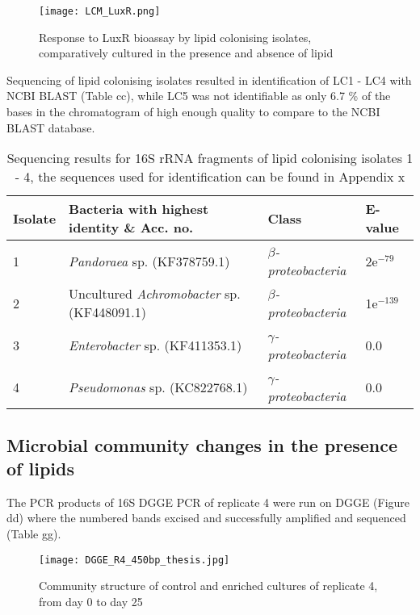 \documentclass{article}
\begin{document}
\begin{figure}
\texttt{[image: LCM\_LuxR.png]}
\caption{Response to LuxR bioassay by lipid colonising isolates, comparatively cultured in the presence and absence of lipid }
\end{figure}

Sequencing of lipid colonising isolates resulted in identification of LC1 - LC4 with NCBI BLAST (Table cc), while LC5 was not identifiable as only 6.7 \% of the bases in the chromatogram of high enough quality to compare to the NCBI BLAST database.
	
\begin{table}
\begin{tabular}{ | l | p{7.8cm} | p{3cm} | l | }
\hline
Isolate & Bacteria with highest identity \& Acc. no. & Class & E-value \\
\hline
1 &  \emph{Pandoraea} sp. (KF378759.1) & \emph{$\beta$-proteobacteria} & 2e$^{-79}$ \\
\hline
2 & Uncultured \emph{Achromobacter} sp. (KF448091.1) & \emph{$\beta$-proteobacteria} & 1e$^{-139}$ \\
\hline
3 & \emph{Enterobacter} sp. (KF411353.1) & \emph{$\gamma$-proteobacteria} & 0.0 \\
\hline
4 & \emph{Pseudomonas} sp. (KC822768.1) & \emph{$\gamma$-proteobacteria} & 0.0 \\
\hline
\end{tabular}
\caption{Sequencing results for 16S rRNA fragments of lipid colonising isolates 1 - 4, the sequences used for identification can be found in Appendix x}
\end{table}

\subsection{Microbial community changes in the presence of lipids}
The PCR products of 16S DGGE PCR  of replicate 4 were run on DGGE (Figure dd) where the numbered bands excised and successfully amplified and sequenced (Table gg). 

\begin{figure}
\texttt{[image: DGGE\_R4\_450bp\_thesis.jpg]}
\caption{Community structure of control and enriched cultures of replicate 4, from day 0 to day 25}
\end{figure}
\end{document}

